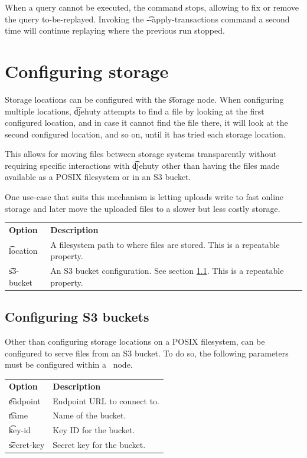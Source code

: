   When a query cannot be executed, the command stops, allowing to fix or
  remove the query to-be-replayed.  Invoking the \t{-{}-apply-transactions}
  command a second time will continue replaying where the previous run stopped.

\section{Configuring storage}

  Storage locations can be configured with the \t{storage} node.
  When configuring multiple locations, \t{djehuty} attempts to find a
  file by looking at the first configured location, and in case it cannot
  find the file there, it will look at the second configured location,
  and so on, until it has tried each storage location.

  This allows for moving files between storage systems transparently
  without requiring specific interactions with \t{djehuty} other than
  having the files made available as a POSIX filesystem or in an S3 bucket.

  One use-case that suits this mechanism is letting uploads write to
  fast online storage and later move the uploaded files to a slower but
  less costly storage.

\begin{tabularx}{\textwidth}{*{1}{!{\VRule[-1pt]}l}!{\VRule[-1pt]}X}
  \headrow
  \textbf{Option}            & \textbf{Description}\\
  \t{location}               & A filesystem path to where files are stored.
                               This is a repeatable property.\\
  \t{s3-bucket}              & An S3 bucket configuration. See section
                               \ref{sec:s3-buckets}. This is a repeatable
                               property.
\end{tabularx}

\subsection{Configuring S3 buckets}
\label{sec:s3-buckets}

  Other than configuring storage locations on a POSIX filesystem,
   can be configured to serve files from an S3 bucket.
  To do so, the following parameters must be configured within a\
   node.

\begin{tabularx}{\textwidth}{*{1}{!{\VRule[-1pt]}l}!{\VRule[-1pt]}X}
  \headrow
  \textbf{Option}             & \textbf{Description}\\
  \t{endpoint}                & Endpoint URL to connect to.\\
  \t{name}                    & Name of the bucket.\\
  \t{key-id}                  & Key ID for the bucket.\\
  \t{secret-key}              & Secret key for the bucket.
\end{tabularx}

